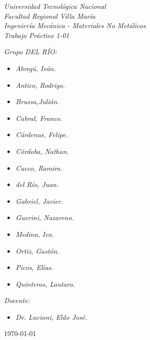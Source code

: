 \begin{titlepage}
	
	\begin{center}
		{\huge \textit{Universidad Tecnológica Nacional}}\\
        \vspace{0.5cm}
		{\LARGE \textit{Facultad Regional Villa María}}\\
		\vspace{1.5cm}
        {\LARGE{\textit{Ingeniería Mecánica - Materiales No Metálicos}}}\\
		\vspace{1.5cm}
        \LARGE{\textit{Trabajo Práctico 1-01}}
	\end{center}
	
	\vfill

    \textit{Grupo DEL RÍO:}
	\begin{itemize}
		\item \textit{Abregú, Iván.}
		\item \textit{Antico, Rodrigo.}
		\item \textit{Brussa,Julián.}
		\item \textit{Cabral, Franco.}
        \item \textit{Cárdenas, Felipe.}
        \item \textit{Córdoba, Nathan.}
        \item \textit{Cucco, Ramiro.}
        \item \textit{del Río, Juan.}
        \item \textit{Gabriel, Javier.}
        \item \textit{Guerini, Nazareno.}
        \item \textit{Medina, Ivo.}
        \item \textit{Ortiz, Gastón.}
        \item \textit{Picos, Elías.}
        \item \textit{Quinteros, Lautaro.}
	\end{itemize}
    
	\textit{Docente:}
	\begin{itemize}
		\item \textit{Dr. Lucioni, Eldo José.}
	\end{itemize}
	\centering
	\today
	
\end{titlepage}